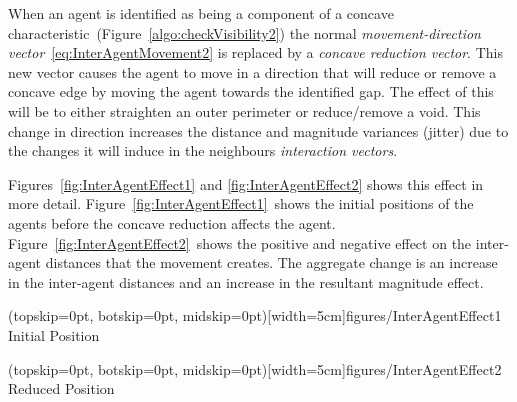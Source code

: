 \documentclass{ieeeaccess}
\begin{document}
When an agent is identified as being a component of a concave characteristic~(Figure~\ref{algo:checkVisibility2}) the normal \textit{movement-direction vector}~\eqref{eq:InterAgentMovement2} is replaced by a \textit{concave reduction vector}. This new vector causes the agent to move in a direction that will reduce or remove a concave edge by moving the agent towards the identified gap. The effect of this will be to either straighten an outer perimeter or reduce/remove a void. This change in direction increases the distance and magnitude variances (jitter) due to the changes it will induce in the neighbours \textit{interaction vectors}.

Figures~\ref{fig:InterAgentEffect1} and \ref{fig:InterAgentEffect2} shows this effect in more detail. Figure~\ref{fig:InterAgentEffect1}~shows the initial positions of the agents before the concave reduction affects the agent. Figure~\ref{fig:InterAgentEffect2}~shows the positive and negative effect on the inter-agent distances that the movement creates. The aggregate change is an increase in the inter-agent distances and an increase in the resultant magnitude effect.

\Figure[t!](topskip=0pt, botskip=0pt, midskip=0pt)[width=5cm]{figures/InterAgentEffect1}
{Initial Position\label{fig:InterAgentEffect1}}


\Figure[t!](topskip=0pt, botskip=0pt, midskip=0pt)[width=5cm]{figures/InterAgentEffect2}
{Reduced Position\label{fig:InterAgentEffect2}}

\end{document}
